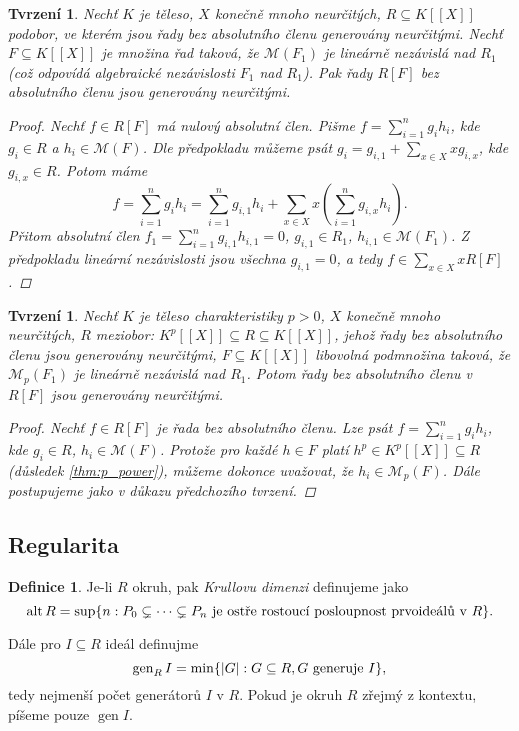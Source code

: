\documentclass[11pt,a4paper]{article}
\newcommand\p[1]{\mathcal{ #1 }} %
\newcommand*{\ml}[1]{\[\textstyle\let\displaystyle\textstyle#1\]}	%
\newcommand*{\mld}[1]{\[#1\]} %
\DeclareMathOperator{\alt}{alt} %
\DeclareMathOperator{\gen}{gen} %
\newcounter{numb}
\theoremstyle{definition}
\newtheorem*{definice}{Definice}
\theoremstyle{plain}
\newtheorem{tvrzeni}[numb]{Tvrzení}
\begin{document}
\begin{tvrzeni}
	Nechť $K$ je těleso, $X$ konečně mnoho neurčitých, $R \subseteq K[[X]]$ podobor, ve kterém jsou řady bez absolutního členu generovány neurčitými. Nechť $F \subseteq K[[X]]$ je množina řad taková, že $\p M(F_1)$ je lineárně nezávislá nad $R_1$ (což odpovídá algebraické nezávislosti $F_1$ nad $R_1$). Pak řady $R[F]$ bez absolutního členu jsou generovány neurčitými.
	
	\begin{proof}
		\newcommand*{\I}{_{i = 1}^n}
		
		Nechť $f \in R[F]$ má nulový absolutní člen. Pišme $f = \sum\I g_i h_i$, kde $g_i \in R$ a $h_i \in \p M(F)$. Dle předpokladu můžeme psát $g_i = g_{i, 1} + \sum_{x \in X} x g_{i, x}$, kde $g_{i, x} \in R$. Potom máme
		\mld{
			f = \sum\I g_i h_i = \sum\I g_{i, 1} h_i + \sum_{x \in X} x (\sum\I g_{i, x} h_i).
		}
		Přitom absolutní člen $f_1 = \sum\I g_{i, 1} h_{i, 1} = 0$, $g_{i, 1} \in R_1$, $h_{i, 1} \in \p M(F_1)$. Z předpokladu lineární nezávislosti jsou všechna $g_{i, 1} = 0$, a tedy $f \in \sum_{x \in X} x R[F]$. 
	\end{proof}
\end{tvrzeni}

\begin{tvrzeni} \label{thm:RpF_absOK}
	Nechť $K$ je těleso charakteristiky $p > 0$, $X$ konečně mnoho neurčitých, $R$ meziobor: $K^p[[X]] \subseteq R \subseteq K[[X]]$, jehož řady bez absolutního členu jsou generovány neurčitými, $F \subseteq K[[X]]$ libovolná podmnožina taková, že $\p M_p(F_1)$ je lineárně nezávislá nad $R_1$. Potom řady bez absolutního členu v $R[F]$ jsou generovány neurčitými.
	
	\begin{proof}
		Nechť $f \in R[F]$ je řada bez absolutního členu. Lze psát $f = \sum_{i = 1}^n g_i h_i$, kde $g_i \in R$, $h_i \in \p M(F)$. Protože pro každé $h \in F$ platí $h^p \in K^p[[X]] \subseteq R$ (důsledek \ref{thm:p_power}), můžeme dokonce uvažovat, že $h_i \in \p M_p(F)$. Dále postupujeme jako v důkazu předchozího tvrzení.
	\end{proof}
\end{tvrzeni}
	

\subsection{Regularita}

\begin{definice}
	Je-li $R$ okruh, pak \emph{Krullovu dimenzi} definujeme jako
	\ml{
		\alt R = \sup\{n: P_0 \subsetneq \cdots \subsetneq P_n \text{ je ostře rostoucí posloupnost prvoideálů v } R\}.
	}

	Dále pro $I \subseteq R$ ideál definujme
	\ml{
		\gen_R I = \min\{|G|: G \subseteq R, G \text{ generuje } I\},
	}
	tedy nejmenší počet generátorů $I$ v $R$. Pokud je okruh $R$ zřejmý z kontextu, píšeme pouze $\gen I$.
\end{definice}
\end{document}
